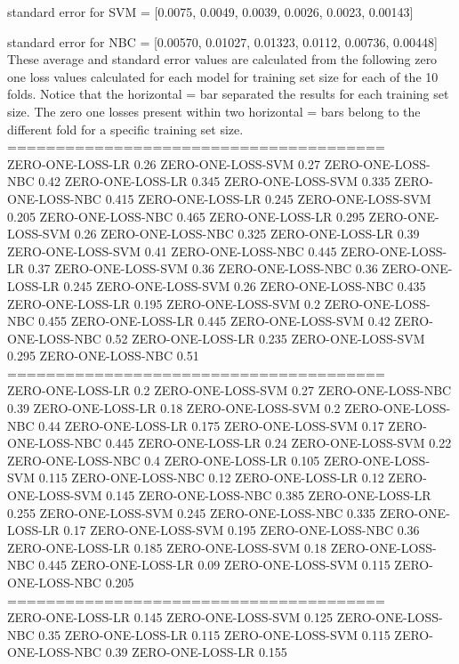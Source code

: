 \documentclass[12pt]{article}
\begin{document}
standard error for SVM = [0.0075, 0.0049, 0.0039, 0.0026, 0.0023, 0.00143]

standard error for NBC = [0.00570, 0.01027, 0.01323, 0.0112, 0.00736, 0.00448]\\

These average and standard error values are calculated from the following zero
one loss values calculated for each model for training set size for each of the 10 folds.
Notice that the horizontal = bar separated the results for each training set size. The
zero one losses present within two horizontal = bars belong to the different fold for
a specific training set size.\\

\noindent=======================================\\
ZERO-ONE-LOSS-LR 0.26
ZERO-ONE-LOSS-SVM 0.27
ZERO-ONE-LOSS-NBC 0.42
ZERO-ONE-LOSS-LR 0.345
ZERO-ONE-LOSS-SVM 0.335
ZERO-ONE-LOSS-NBC 0.415
ZERO-ONE-LOSS-LR 0.245
ZERO-ONE-LOSS-SVM 0.205
ZERO-ONE-LOSS-NBC 0.465
ZERO-ONE-LOSS-LR 0.295
ZERO-ONE-LOSS-SVM 0.26
ZERO-ONE-LOSS-NBC 0.325
ZERO-ONE-LOSS-LR 0.39
ZERO-ONE-LOSS-SVM 0.41
ZERO-ONE-LOSS-NBC 0.445
ZERO-ONE-LOSS-LR 0.37
ZERO-ONE-LOSS-SVM 0.36
ZERO-ONE-LOSS-NBC 0.36
ZERO-ONE-LOSS-LR 0.245
ZERO-ONE-LOSS-SVM 0.26
ZERO-ONE-LOSS-NBC 0.435
ZERO-ONE-LOSS-LR 0.195
ZERO-ONE-LOSS-SVM 0.2
ZERO-ONE-LOSS-NBC 0.455
ZERO-ONE-LOSS-LR 0.445
ZERO-ONE-LOSS-SVM 0.42
ZERO-ONE-LOSS-NBC 0.52
ZERO-ONE-LOSS-LR 0.235
ZERO-ONE-LOSS-SVM 0.295
ZERO-ONE-LOSS-NBC 0.51\\
=======================================\\
ZERO-ONE-LOSS-LR 0.2
ZERO-ONE-LOSS-SVM 0.27
ZERO-ONE-LOSS-NBC 0.39
ZERO-ONE-LOSS-LR 0.18
ZERO-ONE-LOSS-SVM 0.2
ZERO-ONE-LOSS-NBC 0.44
ZERO-ONE-LOSS-LR 0.175
ZERO-ONE-LOSS-SVM 0.17
ZERO-ONE-LOSS-NBC 0.445
ZERO-ONE-LOSS-LR 0.24
ZERO-ONE-LOSS-SVM 0.22
ZERO-ONE-LOSS-NBC 0.4
ZERO-ONE-LOSS-LR 0.105
ZERO-ONE-LOSS-SVM 0.115
ZERO-ONE-LOSS-NBC 0.12
ZERO-ONE-LOSS-LR 0.12
ZERO-ONE-LOSS-SVM 0.145
ZERO-ONE-LOSS-NBC 0.385
ZERO-ONE-LOSS-LR 0.255
ZERO-ONE-LOSS-SVM 0.245
ZERO-ONE-LOSS-NBC 0.335
ZERO-ONE-LOSS-LR 0.17
ZERO-ONE-LOSS-SVM 0.195
ZERO-ONE-LOSS-NBC 0.36
ZERO-ONE-LOSS-LR 0.185
ZERO-ONE-LOSS-SVM 0.18
ZERO-ONE-LOSS-NBC 0.445
ZERO-ONE-LOSS-LR 0.09
ZERO-ONE-LOSS-SVM 0.115
ZERO-ONE-LOSS-NBC 0.205\\
=======================================\\
ZERO-ONE-LOSS-LR 0.145
ZERO-ONE-LOSS-SVM 0.125
ZERO-ONE-LOSS-NBC 0.35
ZERO-ONE-LOSS-LR 0.115
ZERO-ONE-LOSS-SVM 0.115
ZERO-ONE-LOSS-NBC 0.39
ZERO-ONE-LOSS-LR 0.155
\end{document}
